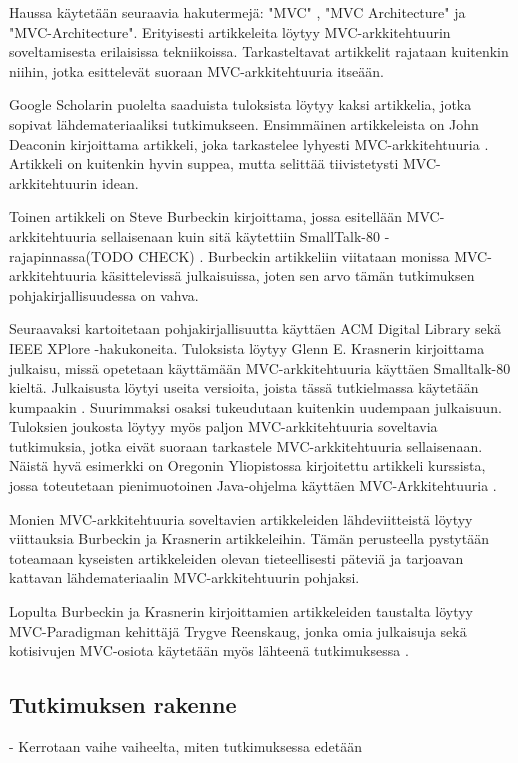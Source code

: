 \documentclass[finnish,utf8,nonumbib,palatino,kandi]{gradu2}
\begin{document}
Haussa käytetään seuraavia hakutermejä: "MVC" , "MVC Architecture" ja "MVC-Architecture".  Erityisesti
artikkeleita löytyy MVC-arkkitehtuurin soveltamisesta erilaisissa tekniikoissa. Tarkasteltavat artikkelit rajataan kuitenkin niihin, jotka esittelevät suoraan MVC-arkkitehtuuria itseään.  

Google Scholarin puolelta saaduista tuloksista löytyy kaksi artikkelia, jotka sopivat
lähdemateriaaliksi tutkimukseen. Ensimmäinen artikkeleista on John Deaconin kirjoittama artikkeli, joka 
tarkastelee lyhyesti MVC-arkkitehtuuria \cite{Deacon:1995}. Artikkeli on kuitenkin hyvin suppea, mutta
selittää tiivistetysti MVC-arkkitehtuurin idean.  

Toinen artikkeli on Steve Burbeckin kirjoittama, jossa esitellään MVC-arkkitehtuuria sellaisenaan kuin 
sitä käytettiin SmallTalk-80 -rajapinnassa(TODO CHECK) \cite{Burbeck}. Burbeckin artikkeliin viitataan
monissa MVC-arkkitehtuuria käsittelevissä julkaisuissa, joten sen arvo tämän tutkimuksen pohjakirjallisuudessa on vahva. 

Seuraavaksi kartoitetaan pohjakirjallisuutta käyttäen ACM Digital Library sekä IEEE XPlore -hakukoneita. Tuloksista löytyy Glenn E.
Krasnerin kirjoittama julkaisu, missä opetetaan käyttämään MVC-arkkitehtuuria käyttäen Smalltalk-80 kieltä. Julkaisusta löytyi useita versioita, joista tässä tutkielmassa käytetään kumpaakin \cite{Krasner} \cite{Krasner:desc}.  Suurimmaksi osaksi tukeudutaan kuitenkin uudempaan julkaisuun. Tuloksien joukosta
löytyy myös paljon MVC-arkkitehtuuria soveltavia tutkimuksia, jotka eivät suoraan tarkastele MVC-arkkitehtuuria sellaisenaan. Näistä hyvä esimerkki on
Oregonin Yliopistossa kirjoitettu artikkeli kurssista, jossa toteutetaan pienimuotoinen Java-ohjelma käyttäen MVC-Arkkitehtuuria \cite{Morse}. 

Monien MVC-arkkitehtuuria soveltavien artikkeleiden lähdeviitteistä löytyy viittauksia Burbeckin ja Krasnerin artikkeleihin. Tämän perusteella pystytään
toteamaan kyseisten artikkeleiden olevan tieteellisesti päteviä ja tarjoavan kattavan lähdemateriaalin MVC-arkkitehtuurin pohjaksi. 

Lopulta Burbeckin ja Krasnerin kirjoittamien artikkeleiden taustalta löytyy MVC-Paradigman kehittäjä Trygve Reenskaug, jonka omia julkaisuja sekä kotisivujen MVC-osiota
käytetään myös lähteenä tutkimuksessa \cite{Reenskaug}. 

\subsection {Tutkimuksen rakenne}
- Kerrotaan vaihe vaiheelta, miten tutkimuksessa edetään
\end{document}
